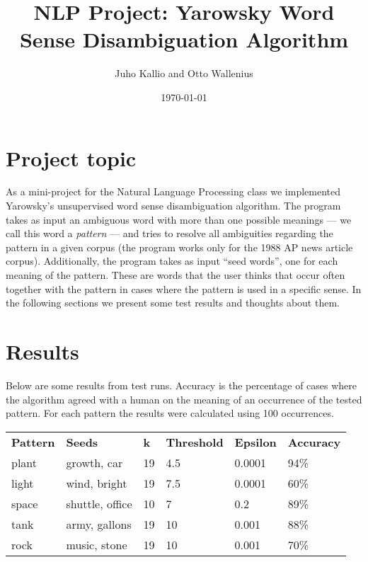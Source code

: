 \documentclass[finnish]{article}
\title{NLP Project: Yarowsky Word Sense Disambiguation Algorithm}
\author{Juho Kallio and Otto Wallenius}
\date{\today}
\begin{document}
\maketitle
\section{Project topic}
As a mini-project for the Natural Language Processing class we implemented Yarowsky's unsupervised word sense disambiguation algorithm. The program takes as input an ambiguous word with more than one possible meanings --- we call this word a \emph{pattern} --- and tries to resolve all ambiguities regarding the pattern in a given corpus (the program works only for the 1988 AP news article corpus). Additionally, the program takes as input ``seed words'', one for each meaning of the pattern. These are words that the user thinks that occur often together with the pattern in cases where the pattern is used in a specific sense. In the following sections we present some test results and thoughts about them.

\section{Results}
Below are some results from test runs. Accuracy is the percentage of cases where the algorithm agreed with a human on the meaning of an occurrence of the tested pattern. For each pattern the results were calculated using 100 occurrences.

\begin{tabular}{l l l l l l}

\textbf{Pattern} & \textbf{Seeds} & \textbf{k} & \textbf{Threshold} & \textbf{Epsilon} & \textbf{Accuracy} \\
plant   & growth, car     & 19 & 4.5 & 0.0001 & 94\% \\
light   & wind, bright    & 19 & 7.5 & 0.0001 & 60\% \\
space   & shuttle, office & 10 & 7   & 0.2    & 89\% \\
tank    & army, gallons   & 19 & 10  & 0.001  & 88\% \\
rock    & music, stone    & 19 & 10  & 0.001  & 70\%
\end{tabular}
\end{document}

